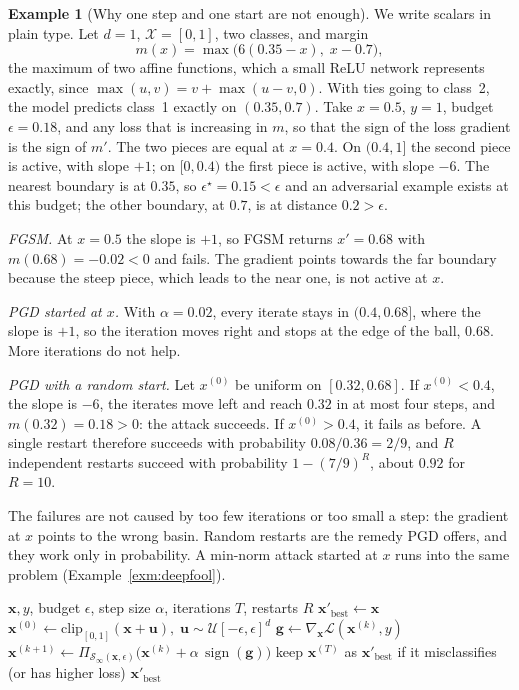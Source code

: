 \documentclass[10pt,a4paper]{extarticle}
\theoremstyle{definition}
\newtheorem{example}{Example}[section]
\newcommand{\X}{\mathcal{X}}
\newcommand{\Loss}{\mathcal{L}}
\newcommand{\x}{\mathbf{x}}
\newcommand{\xadv}{\mathbf{x}'}
\newcommand{\Proj}{\Pi}
\DeclareMathOperator{\sign}{sign}
\begin{document}
\begin{example}[Why one step and one start are not enough]\label{exm:kink}
We write scalars in plain type. Let \(d=1\), \(\X=[0,1]\), two classes, and margin
\[
m(x)=\max\big(6(0.35-x),\;x-0.7\big),
\]
the maximum of two affine functions, which a small ReLU network represents exactly, since \(\max(u,v)=v+\max(u-v,0)\). With ties going to class~2, the model predicts class~1 exactly on \((0.35,0.7)\). Take \(x=0.5\), \(y=1\), budget \(\epsilon=0.18\), and any loss that is increasing in \(m\), so that the sign of the loss gradient is the sign of \(m'\). The two pieces are equal at \(x=0.4\). On \((0.4,1]\) the second piece is active, with slope \(+1\); on \([0,0.4)\) the first piece is active, with slope \(-6\). The nearest boundary is at \(0.35\), so \(\epsilon^\star=0.15<\epsilon\) and an adversarial example exists at this budget; the other boundary, at \(0.7\), is at distance \(0.2>\epsilon\).

\emph{FGSM.} At \(x=0.5\) the slope is \(+1\), so FGSM returns \(x'=0.68\) with \(m(0.68)=-0.02<0\) and fails. The gradient points towards the far boundary because the steep piece, which leads to the near one, is not active at \(x\).

\emph{PGD started at \(x\).} With \(\alpha=0.02\), every iterate stays in \((0.4,0.68]\), where the slope is \(+1\), so the iteration moves right and stops at the edge of the ball, \(0.68\). More iterations do not help.

\emph{PGD with a random start.} Let \(x^{(0)}\) be uniform on \([0.32,0.68]\). If \(x^{(0)}<0.4\), the slope is \(-6\), the iterates move left and reach \(0.32\) in at most four steps, and \(m(0.32)=0.18>0\): the attack succeeds. If \(x^{(0)}>0.4\), it fails as before. A single restart therefore succeeds with probability \(0.08/0.36=2/9\), and \(R\) independent restarts succeed with probability \(1-(7/9)^R\), about \(0.92\) for \(R=10\).

The failures are not caused by too few iterations or too small a step: the gradient at \(x\) points to the wrong basin. Random restarts are the remedy PGD offers, and they work only in probability. A min-norm attack started at \(x\) runs into the same problem (Example~\ref{exm:deepfool}).
\end{example}

\begin{algorithm}[h]
\caption{PGD attack, \(\ell_\infty\), untargeted}
\begin{algorithmic}[1]
\Require \(\x, y\), budget \(\epsilon\), step size \(\alpha\), iterations \(T\), restarts \(R\)
\State \(\xadv_{\text{best}} \gets \x\)
  \State \(\x^{(0)} \gets \mathrm{clip}_{[0,1]}(\x + \mathbf{u}),\; \mathbf{u}\sim\mathcal{U}[-\epsilon,\epsilon]^d\)
    \State \(\mathbf{g} \gets \nabla_{\x}\Loss(\x^{(k)},y)\)
    \State \(\x^{(k+1)} \gets \Proj_{\mathcal{S}_\infty(\x,\epsilon)}\big(\x^{(k)}+\alpha\,\sign(\mathbf{g})\big)\)
  \EndFor
  \State keep \(\x^{(T)}\) as \(\xadv_{\text{best}}\) if it misclassifies (or has higher loss)
\EndFor
\State \Return \(\xadv_{\text{best}}\)
\end{algorithmic}
\end{algorithm}
\end{document}
